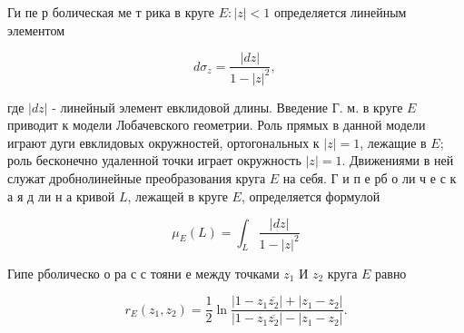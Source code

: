 \documentclass[10pt]{article}
\begin{document}
Ги пе р болическая ме т рика в круге $E:|z|<1$ определяется линейным элементом



\[

d \sigma_{z}=\frac{|d z|}{1-|z|^{2}} \text {, }

\]



где $|d z|$ - линейный элемент евклидовой длины. Введение Г. м. в круге $E$ приводит к модели Лобачевского геометрии. Роль прямых в данной модели играют дуги евклидовых окружностей, ортогональных к $|z|=1$, лежащие в $E$; роль бесконечно удаленной точки играет окружность $|z|=1$. Движениями в ней служат дробнолинейные преобразования круга $E$ на себя. Г и п е рб о ли ч е с к а я д ли н а кривой $L$, лежащей в круге $E$, определяется формулой



\[

\mu_{E}(L)=\int_{L} \frac{|d z|}{1-|z|^{2}}

\]



Гипе рболическо о ра с с тояни е между точками $z_{1}$ И $z_{2}$ круга $E$ равно



\[

r_{E}\left(z_{1}, z_{2}\right)=\frac{1}{2} \ln \frac{\left|1-z_{1} \overline{z_{2}}\right|+\left|z_{1}-z_{2}\right|}{\left|1-z_{1} \overline{z_{2}}\right|-\left|z_{1}-z_{2}\right|} .

\]
\end{document}
